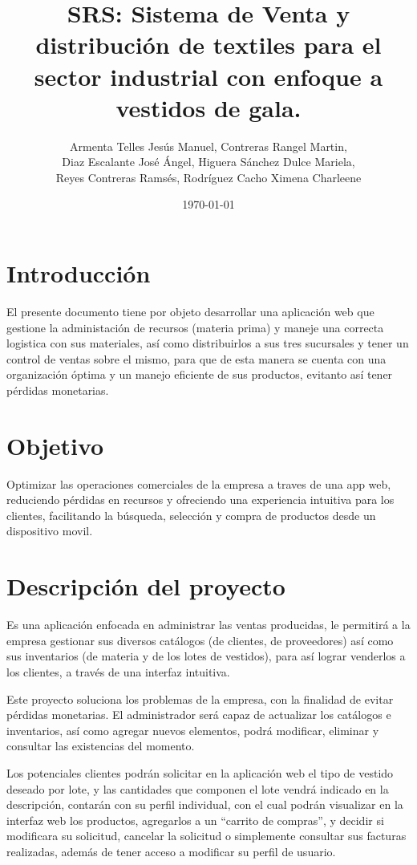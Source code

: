 \documentclass[12pt,a4paper]{article}
\title{SRS: Sistema de Venta y distribución de textiles para el sector industrial con enfoque a vestidos de gala.}
\author{
	\begin{tabular}{c}
		Armenta Telles Jesús Manuel, Contreras Rangel Martin, \\
		Diaz Escalante José Ángel, 
		Higuera Sánchez Dulce Mariela, \\
		Reyes Contreras Ramsés, 
		Rodríguez Cacho Ximena Charleene \\
	\end{tabular}
}
\date{\today}
\begin{document}
	\maketitle
	
	\begin{multicols}{2} %
		\section{Introducción}
		El presente documento tiene por objeto desarrollar una aplicación web que gestione la administación de recursos (materia prima) y maneje una correcta logistica con sus materiales, así como distribuirlos a sus tres sucursales y tener un control de ventas sobre el mismo, para que de esta manera se cuenta con una organización óptima y un manejo eficiente de sus productos, evitanto así tener pérdidas monetarias.
		
		\section{Objetivo}
		Optimizar las operaciones comerciales de la empresa a traves de una app web, reduciendo pérdidas en recursos y ofreciendo una experiencia intuitiva para los clientes, facilitando la búsqueda, selección y compra de productos desde un dispositivo movil. 
		
		\section{Descripción del proyecto}
		Es una aplicación enfocada en administrar las ventas
		producidas, le permitirá a la empresa gestionar sus diversos catálogos (de clientes,
		de proveedores) así como sus inventarios (de materia y de los lotes de vestidos),
		para así lograr venderlos a los clientes, a través de una interfaz intuitiva. \linebreak  
		
		Este proyecto soluciona los problemas de la empresa, con la finalidad de evitar pérdidas
		monetarias. El administrador será capaz de actualizar los catálogos e inventarios, así como
		agregar nuevos elementos, podrá modificar, eliminar y consultar las existencias del
		momento. \linebreak  
		
		Los potenciales clientes podrán solicitar en la aplicación web el tipo de vestido
		deseado por lote, y las cantidades que componen el lote vendrá indicado en la
		descripción, contarán con su perfil individual, con el cual podrán visualizar en la
		interfaz web los productos, agregarlos a un “carrito de compras”, y decidir si
		modificara su solicitud, cancelar la solicitud o simplemente consultar sus facturas
		realizadas, además de tener acceso a modificar su perfil de usuario.
		

\end{multicols}
\end{document}
